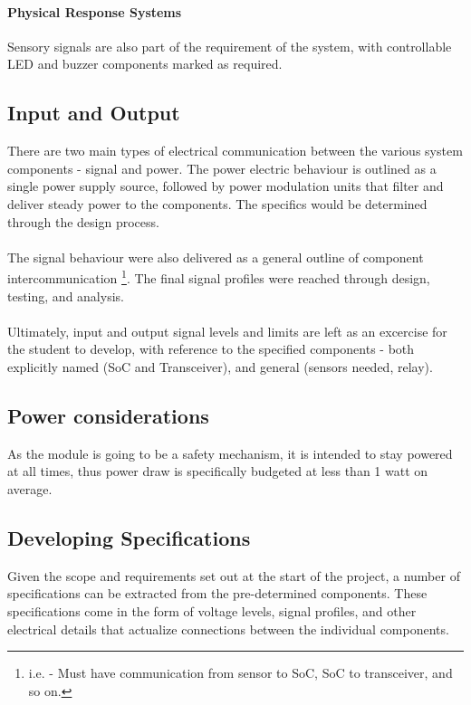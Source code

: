 \documentclass[12pt]{article}
\begin{document}
    \paragraph{Physical Response Systems}
    Sensory signals are also part of the requirement of the system, with controllable LED and buzzer components marked as required. 

    \subsection{Input and Output} 
    There are two main types of electrical communication between the various system components - signal and power. The power electric behaviour is outlined as a single power supply source, followed by power modulation units that filter and deliver steady power to the components. The specifics would be determined through the design process.

    \paragraph{}
    The signal behaviour were also delivered as a general outline of component intercommunication \footnote{i.e. - Must have communication from sensor to SoC, SoC to transceiver, and so on.}. The final signal profiles were reached through design, testing, and analysis.

    \paragraph{}
    Ultimately, input and output signal levels and limits are left as an excercise for the student to develop, with reference to the specified components - both explicitly named (SoC and Transceiver), and general (sensors needed, relay).

    \subsection{Power considerations}
    As the module is going to be a safety mechanism, it is intended to stay powered at all times, thus power draw is specifically budgeted at less than 1 watt on average.
	
    \subsection{Developing Specifications}
    Given the scope and requirements set out at the start of the project, a number of specifications can be extracted from the pre-determined components. These specifications come in the form of voltage levels, signal profiles, and other electrical details that actualize connections between the individual components.
\end{document}
